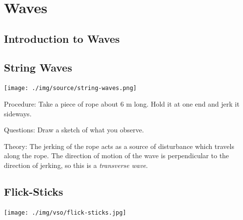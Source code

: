 \section{Waves}

\begin{multicols}{2}


\section*{Introduction to Waves}


\subsection{String Waves}

\begin{center}
\texttt{[image: ./img/source/string-waves.png]}
\end{center}

\begin{description*}
\item[Procedure:]{Take a piece of rope about 6 m long. Hold it at one end and jerk it sideways.}
\item[Questions:]{Draw a sketch of what you observe.}
\item[Theory:]{The jerking of the rope acts as a source of disturbance which travels along the rope. The direction of motion of the wave is perpendicular to the direction of jerking, so this is a \emph{transverse wave}.}
\end{description*}

\subsection{Flick-Sticks}

\begin{center}
\texttt{[image: ./img/vso/flick-sticks.jpg]}
\end{center}


\end{multicols}
